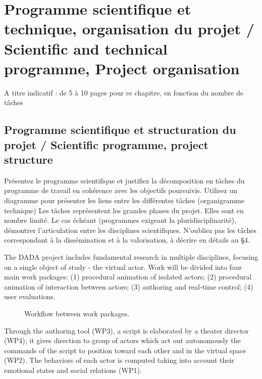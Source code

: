 
\section{Programme scientifique et technique, organisation du projet / Scientific and technical programme, Project organisation}
\begin{xcomment}  
A titre indicatif : de 5 à 10  pages pour ce chapitre, en fonction du nombre de tâches
\end{xcomment}

\subsection{Programme scientifique et structuration du projet  / Scientific programme, project structure}
\begin{xcomment}  
 Pr\'esentez le programme scientifique et justifiez la d\'ecomposition en tâches du programme de travail en coh\'erence avec les objectifs poursuivis. 
Utilisez un diagramme pour pr\'esenter les liens entre les diff\'erentes tâches (organigramme technique)
Les tâches repr\'esentent les grandes phases du projet. Elles sont en nombre limit\'e.
Le cas \'ech\'eant (programmes exigeant la pluridisciplinarit\'e), d\'emontrer l'articulation entre les disciplines scientifiques.
N'oubliez pas les tâches correspondant à la diss\'emination et à la valorisation, à d\'ecrire en d\'etails au §4.

\end{xcomment}

The DADA project includes fundamental research in multiple disciplines, focusing on a single object of study - the virtual actor. Work will be divided into four main work packages: (1) procedural animation of isolated actors; (2) procedural animation of interaction between actors; (3) authoring and real-time control; (4) user evaluations. 

\begin{figure}[htbp]
\begin{center}

\caption{Workflow between work packages.}
\label{default}
\end{center}
\end{figure}

Through the authoring tool (WP3), a script is elaborated by a theater director (WP4); it gives direction to group of actors which act out autonomously the commands of the script to position toward each other and in the virtual space (WP2). The behaviors of each actor is computed taking into account their emotional states and social relations (WP1).


